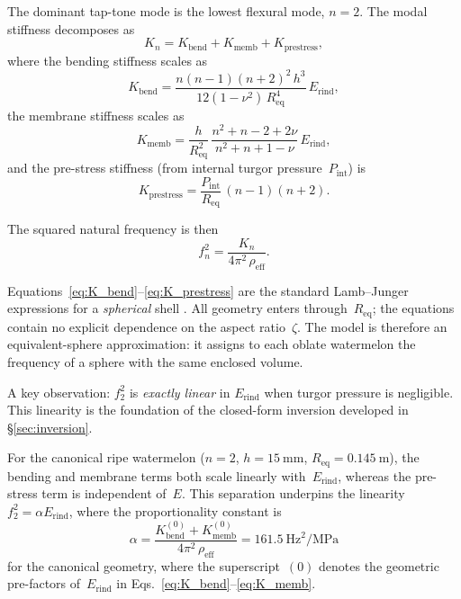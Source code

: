 The dominant tap-tone mode is the lowest flexural mode, $n = 2$.  The
modal stiffness decomposes as
\begin{equation}
  K_n = K_{\mathrm{bend}} + K_{\mathrm{memb}} + K_{\mathrm{prestress}},
  \label{eq:stiffness_decomp}
\end{equation}
where the bending stiffness scales as
\begin{equation}
  K_{\mathrm{bend}} = \frac{n(n-1)(n+2)^2\, h^3}
    {12(1-\nu^2)\, R_{\mathrm{eq}}^4}\, E_{\mathrm{rind}},
  \label{eq:K_bend}
\end{equation}
the membrane stiffness scales as
\begin{equation}
  K_{\mathrm{memb}} = \frac{h}{R_{\mathrm{eq}}^2}\,
    \frac{n^2 + n - 2 + 2\nu}{n^2 + n + 1 - \nu}\,
    E_{\mathrm{rind}},
  \label{eq:K_memb}
\end{equation}
and the pre-stress stiffness (from internal turgor pressure~$P_{\mathrm{int}}$) is
\begin{equation}
  K_{\mathrm{prestress}} = \frac{P_{\mathrm{int}}}{R_{\mathrm{eq}}}
    \, (n-1)(n+2).
  \label{eq:K_prestress}
\end{equation}

The squared natural frequency is then
\begin{equation}
  f_n^2 = \frac{K_n}{4\pi^2\, \rho_{\mathrm{eff}}}.
  \label{eq:f2_squared}
\end{equation}

\noindent
Equations~\eqref{eq:K_bend}--\eqref{eq:K_prestress} are the standard
Lamb--Junger expressions for a \emph{spherical} shell
\cite{lamb1882, Junger1986, Leissa1973, Soedel2004}.  All geometry
enters through~$R_{\mathrm{eq}}$; the equations contain no explicit
dependence on the aspect ratio~$\zeta$.  The model is therefore an
equivalent-sphere approximation: it assigns to each oblate watermelon
the frequency of a sphere with the same enclosed volume.

\noindent A key observation: $f_2^2$ is \emph{exactly linear} in
$E_{\mathrm{rind}}$ when turgor pressure is negligible.  This linearity
is the foundation of the closed-form inversion developed in
\S\ref{sec:inversion}.

For the canonical ripe watermelon ($n = 2$, $h = \SI{15}{\milli\metre}$,
$R_{\mathrm{eq}} = \SI{0.145}{\metre}$), the bending and membrane
terms both scale linearly with~$E_{\mathrm{rind}}$, whereas the
pre-stress term is independent of~$E$.  This separation underpins the
linearity $f_2^2 = \alpha E_{\mathrm{rind}}$, where the proportionality
constant is
\begin{equation}
  \alpha = \frac{K_{\mathrm{bend}}^{(0)} + K_{\mathrm{memb}}^{(0)}}
    {4\pi^2\, \rho_{\mathrm{eff}}}
    = \SI{161.5}{\hertz\squared\per\mega\pascal}
  \label{eq:alpha_value}
\end{equation}
for the canonical geometry, where the superscript~$(0)$ denotes the
geometric pre-factors of~$E_{\mathrm{rind}}$ in
Eqs.~\eqref{eq:K_bend}--\eqref{eq:K_memb}.

